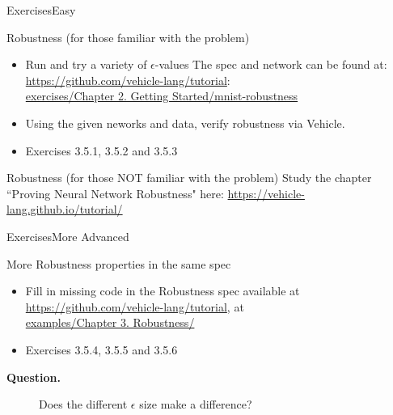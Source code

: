 \documentclass[t,compress,aspectratio=169]{beamer}
\newcommand{\question}[1]{\begin{description}
		\item[\textbf{Question.}] #1
\end{description}}
\begin{document}
\begin{frame}{Exercises}{Easy}


\begin{block}{Robustness (for those familiar with the problem)}
\footnotesize{
\begin{itemize}
\item Run and try a variety of $\epsilon$-values
The spec and network can be found at: 
\url{https://github.com/vehicle-lang/tutorial}:\\
\url{exercises/Chapter 2. Getting Started/mnist-robustness}

\item Using the given neworks and data, verify robustness via Vehicle.
\item \textcolor{aisecred}{Exercises 3.5.1, 3.5.2 and 3.5.3}
\end{itemize}}
\end{block}

\begin{alertblock}{Robustness (for those NOT familiar with the problem)}
\footnotesize{Study the chapter ``Proving Neural Network Robustness" here: \url{https://vehicle-lang.github.io/tutorial/}}
\end{alertblock}
\end{frame}

\begin{frame}{Exercises}{More Advanced}

\begin{block}{More Robustness properties in the same spec}

\begin{itemize}
\item Fill in missing code in the Robustness spec available at   
\url{https://github.com/vehicle-lang/tutorial}, at \\
\url{examples/Chapter 3. Robustness/}
 \item \textcolor{aisecred}{Exercises 3.5.4, 3.5.5 and 3.5.6}
\end{itemize}
\end{block}
\question{Does the different $\epsilon$ size make a difference?}
\end{frame}
\end{document}
